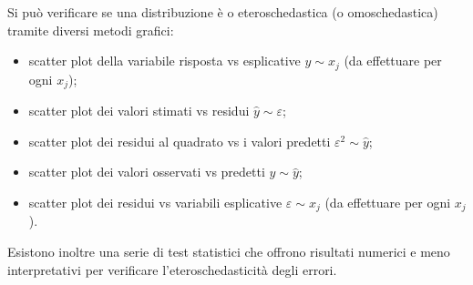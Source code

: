 \documentclass[a4page, 11pt]{article} %
\begin{document}
Si può verificare se una distribuzione è o eteroschedastica (o omoschedastica) tramite diversi metodi grafici:
\begin{itemize}[noitemsep]
  \item scatter plot della variabile risposta vs esplicative $y \sim x_j$ (da effettuare per ogni $x_j$);
  \item scatter plot dei valori stimati vs residui $\hat{y} \sim \varepsilon$;
  \item scatter plot dei residui al quadrato vs i valori predetti $\varepsilon^2 \sim \hat{y}$;
  \item scatter plot dei valori osservati vs predetti $y \sim \hat{y}$;
  \item scatter plot dei residui vs variabili esplicative $\varepsilon \sim x_j$ (da effettuare per ogni $x_j$).
\end{itemize}
Esistono inoltre una serie di test statistici che offrono risultati numerici e meno interpretativi per verificare l'eteroschedasticità degli errori.

\end{document}
